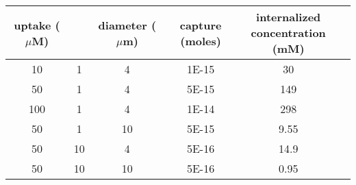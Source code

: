 \begin{tabular}{cccccc}
	\toprule
		uptake ($\mu$M) & \OD & diameter ($\mu$m) & capture (moles) & \makecell{internalized\\concentration (mM)} \\
	\midrule
	10 & 1 & 4 & 1E-15 & 30 \\
	50 & 1 & 4 & 5E-15 & 149 \\
	100 & 1 & 4 & 1E-14 & 298 \\
	50 & 1 & 10 & 5E-15 & 9.55 \\
	50 & 10 & 4 & 5E-16 & 14.9 \\
	50 & 10 & 10 & 5E-16 & 0.95 \\
	\bottomrule
\end{tabular}
